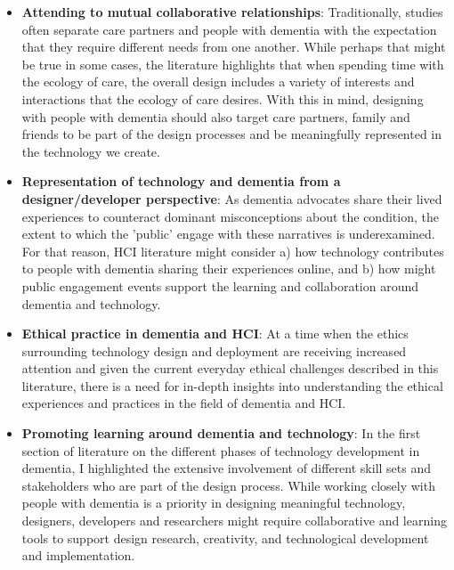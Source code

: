 \begin{itemize}

     \item \textbf{Attending to mutual collaborative relationships}: Traditionally, studies often separate care partners and people with dementia with the expectation that they require different needs from one another. While perhaps that might be true in some cases, the literature highlights that when spending time with the ecology of care, the overall design includes a variety of interests and interactions that the ecology of care desires. With this in mind, designing with people with dementia should also target care partners, family and friends to be part of the design processes and be meaningfully represented in the technology we create.

    \item \textbf{Representation of technology and dementia from a designer/developer perspective}: As dementia advocates share their lived experiences to counteract dominant misconceptions about the condition, the extent to which the 'public' engage with these narratives is underexamined. For that reason, HCI literature might consider a) how technology contributes to people with dementia sharing their experiences online, and b) how might public engagement events support the learning and collaboration around dementia and technology.
    
    \item \textbf{Ethical practice in dementia and HCI}: At a time when the ethics surrounding technology design and deployment are receiving increased attention and given the current everyday ethical challenges described in this literature, there is a need for in-depth insights into understanding the ethical experiences and practices in the field of dementia and HCI.

    \item \textbf{Promoting learning around dementia and technology}: In the first section of literature on the different phases of technology development in dementia, I highlighted the extensive involvement of different skill sets and stakeholders who are part of the design process. While working closely with people with dementia is a priority in designing meaningful technology, designers, developers and researchers might require collaborative and learning tools to support design research, creativity, and technological development and implementation.  
    
\end{itemize}

